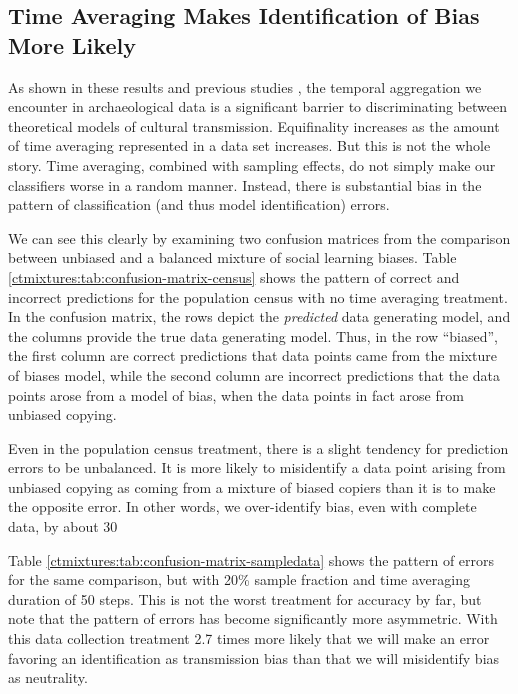 \subsection{Time Averaging Makes Identification of Bias More Likely}

As shown in these results and previous studies \citep{Madsen2012,Porcic2014,Premo2014}, the temporal aggregation we encounter in archaeological data is a significant barrier to discriminating between theoretical models of cultural transmission.  Equifinality increases as the amount of time averaging represented in a data set increases.  But this is not the whole story.  Time averaging, combined with sampling effects, do not simply make our classifiers worse in a random manner.  Instead, there is substantial bias in the pattern of classification (and thus model identification) errors.  

We can see this clearly by examining two confusion matrices from the comparison between unbiased and a balanced mixture of social learning biases.  Table \ref{ctmixtures:tab:confusion-matrix-census} shows the pattern of correct and incorrect predictions for the population census with no time averaging treatment.  In the confusion matrix, the rows depict the \emph{predicted} data generating model, and the columns provide the true data generating model.  Thus, in the row ``biased'', the first column are correct predictions that data points came from the mixture of biases model, while the second column are incorrect predictions that the data points arose from a model of bias, when the data points in fact arose from unbiased copying.

Even in the population census treatment, there is a slight tendency for prediction errors to be unbalanced.  It is more likely to misidentify a data point arising from unbiased copying as coming from a mixture of biased copiers than it is to make the opposite error.  In other words, we over-identify bias, even with complete data, by about 30%

Table \ref{ctmixtures:tab:confusion-matrix-sampledata} shows the pattern of errors for the same comparison, but with 20\% sample fraction and time averaging duration of 50 steps.  This is not the worst treatment for accuracy by far, but note that the pattern of errors has become significantly more asymmetric.  With this data collection treatment 2.7 times more likely that we will make an error favoring an identification as transmission bias than that we will misidentify bias as neutrality.  

